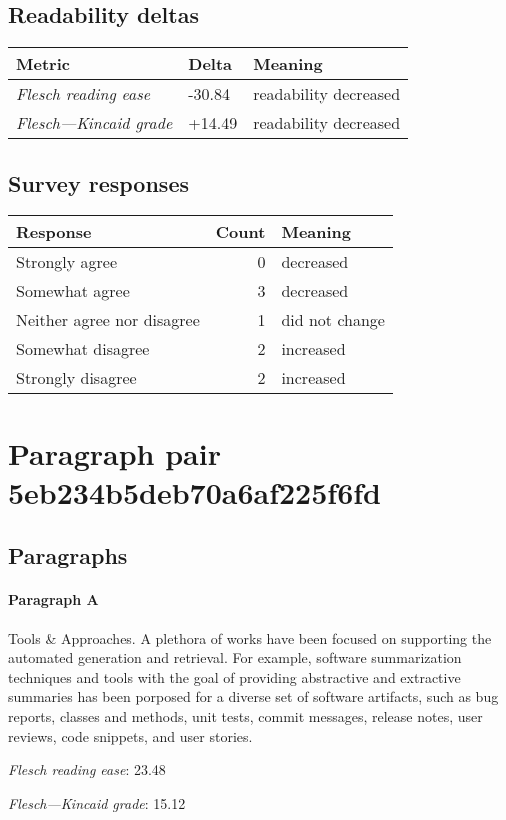 \subsection{Readability deltas}

\begin{tabular}{lll}
\toprule
               \textbf{Metric} & \textbf{Delta} &       \textbf{Meaning} \\
\midrule
    \emph{Flesch reading ease} &         -30.84 &  readability decreased \\
 \emph{Flesch---Kincaid grade} &         +14.49 &  readability decreased \\
\bottomrule
\end{tabular}

\subsection{Survey responses}
\begin{tabular}{lrl}
\toprule
          \textbf{Response} &  \textbf{Count} & \textbf{Meaning} \\
\midrule
             Strongly agree &               0 &        decreased \\
             Somewhat agree &               3 &        decreased \\
 Neither agree nor disagree &               1 &   did not change \\
          Somewhat disagree &               2 &        increased \\
          Strongly disagree &               2 &        increased \\
\bottomrule
\end{tabular}

\section{Paragraph pair 5eb234b5deb70a6af225f6fd}
\subsection{Paragraphs}
\paragraph{Paragraph A}
Tools \& Approaches. A plethora of works have been focused on supporting the automated generation and retrieval. For example, software summarization techniques and tools with the goal of providing abstractive and extractive summaries has been porposed for a diverse set of software artifacts, such as bug reports, classes and methods, unit tests, commit messages, release notes, user reviews, code snippets, and user stories.\par\medskip
\emph{Flesch reading ease}: 23.48\par
\emph{Flesch---Kincaid grade}: 15.12

